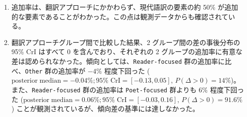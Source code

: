 \documentclass[
  letterpaper,
  DIV=11,
  numbers=noendperiod]{scrartcl}
\begin{document}
\begin{enumerate}
\def\labelenumi{(\alph{enumi})}
\item
  追加率は、翻訳アプローチにかかわらず、現代語訳の要素の約 50\%
  が追加的な要素であることがわかった。この点は観測データからも確認されている。
\item
  翻訳アプローチグループ間で比較した結果、2 グループ間の差の事後分布の
  95\% CrI はすべて 0 を含んでおり、それぞれの 2
  グループの追加率に有意な差は認められなかった。傾向としては、\texttt{Reader-focused}
  群の追加率に比べ、\texttt{Other} 群の追加率が \(-4\%\) 程度下回った
  (\(\mathrm{posterior\; median} = -0.04\%; 95\%\;\mathrm{CrI} = [-0.13, 0.05]\),
  \(P(\Delta>0) = 14\%\))。また、\texttt{Reader-focused} 群の追加率は
  \texttt{Poet-focused} 群よりも \(6\%\) 程度下回った
  (\(\mathrm{posterior\; median} = 0.06\%; 95\%\;\mathrm{CrI} = [-0.03, 0.16]\),
  \(P(\Delta>0) = 91.6\%\))
  ことが観測されているが、傾向差の基準には達しなかった。
\end{enumerate}
\end{document}
